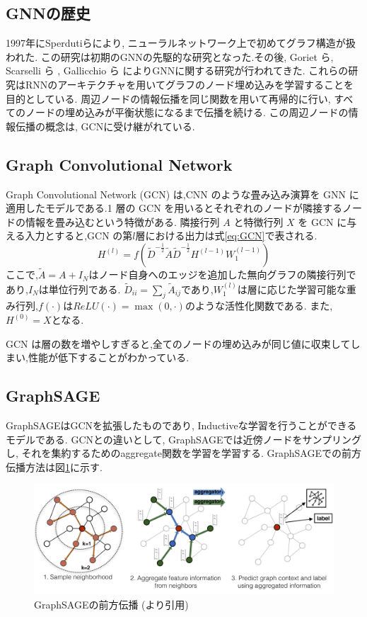 \documentclass[a4j,twoside,12pt,dvipdfmx]{thesis} %
\begin{document}
\subsection{GNNの歴史}
1997年にSperdutiら\cite{sperduti1997supervised}により, ニューラルネットワーク上で初めてグラフ構造が扱われた. この研究は初期のGNNの先駆的な研究となった.その後, Goriet ら\cite{gori2005anew},  Scarselli ら \cite{scarselli2009the} , Gallicchio ら \cite{gallicchio2010graph} によりGNNに関する研究が行われてきた.
これらの研究はRNNのアーキテクチャを用いてグラフのノード埋め込みを学習することを目的としている. 周辺ノードの情報伝播を同じ関数を用いて再帰的に行い, すべてのノードの埋め込みが平衡状態になるまで伝播を続ける. この周辺ノードの情報伝播の概念は, GCNに受け継がれている.

\subsection{Graph Convolutional Network}
Graph Convolutional Network (GCN) \cite{kipf2017semi} は,CNN のような畳み込み演算を GNN に適用したモデルである.1 層の GCN を用いるとそれぞれのノードが隣接するノードの情報を畳み込むという特徴がある.
隣接行列 $A$ と特徴行列 $X$ を GCN に与える入力とすると,GCN の第$l$層における出力は式\ref{eq:GCN}で表される.
\begin{equation}
  \label{eq:GCN}
  H^{(l)}=f(\tilde{D}^{-\frac{1}{2}}\tilde{A}\tilde{D}^{-\frac{1}{2}}H^{(l-1)}W_{1}^{(l-1)})
\end{equation}
ここで,$\tilde{A} = A + I_{N}$はノード自身へのエッジを追加した無向グラフの隣接行列であり,$I_N$は単位行列である.
$\tilde{D}_{ii} = \sum_{j} \tilde{A}_{ij}$であり,$W_{1}^{(l)}$は層に応じた学習可能な重み行列,$f(\cdot)$は$ReLU(\cdot) = \max (0, \cdot)$のような活性化関数である.
また,$H^{(0)}=X$となる.\par
GCN は層の数を増やしすぎると,全てのノードの埋め込みが同じ値に収束してしまい,性能が低下することがわかっている.

\subsection{GraphSAGE}
GraphSAGEはGCNを拡張したものであり, Inductiveな学習を行うことができるモデルである. GCNとの違いとして, GraphSAGEでは近傍ノードをサンプリングし, それを集約するためのaggregate関数を学習を学習する. GraphSAGEでの前方伝播方法は図\ref{fig:SAGE}に示す.
\begin{figure}
  \centering
  \includegraphics[width=\linewidth]
  {img/GraphSAGE.png}
  \caption{GraphSAGEの前方伝播 (\cite{hamilton2017inductive}より引用)}
  \label{fig:SAGE}
\end{figure}
\end{document}
